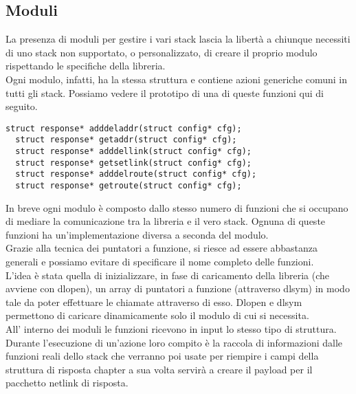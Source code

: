 \subsection{Moduli}
La presenza di moduli per gestire i vari stack lascia la libert\`a a chiunque necessiti di uno stack non supportato, o personalizzato, di creare il proprio modulo rispettando le specifiche della libreria.\\
Ogni modulo, infatti, ha la stessa struttura e contiene azioni generiche comuni in tutti gli stack. Possiamo vedere il prototipo di una di queste funzioni qui di seguito.
\begin{lstlisting}[style=CStyle]
  struct response* adddeladdr(struct config* cfg);
  struct response* getaddr(struct config* cfg);
  struct response* adddellink(struct config* cfg);
  struct response* getsetlink(struct config* cfg);
  struct response* adddelroute(struct config* cfg);
  struct response* getroute(struct config* cfg);
\end{lstlisting}
In breve ogni modulo \`e composto dallo stesso numero di funzioni che si occupano di mediare la comunicazione tra la libreria e il vero stack.
Ognuna di queste funzioni ha un'implementazione diversa a seconda del modulo.\\
Grazie alla tecnica dei puntatori a funzione, si riesce ad essere abbastanza generali e possiamo evitare di specificare il nome completo delle funzioni. \\
L'idea \`e stata quella di inizializzare, in fase di caricamento della libreria (che avviene con dlopen), un array di puntatori a funzione (attraverso dlsym) in modo tale da poter effettuare le chiamate attraverso di esso. Dlopen e dlsym permettono di caricare dinamicamente solo il modulo di cui si necessita.\\
All' interno dei moduli le funzioni ricevono in input lo stesso tipo di struttura. Durante l'esecuzione di un'azione loro compito \`e la raccola di informazioni dalle funzioni reali dello stack che verranno poi usate per riempire i campi della struttura di risposta chapter a sua volta servir\`a a creare il payload per il pacchetto netlink di risposta.
\clearpage{\pagestyle{empty}\cleardoublepage}
